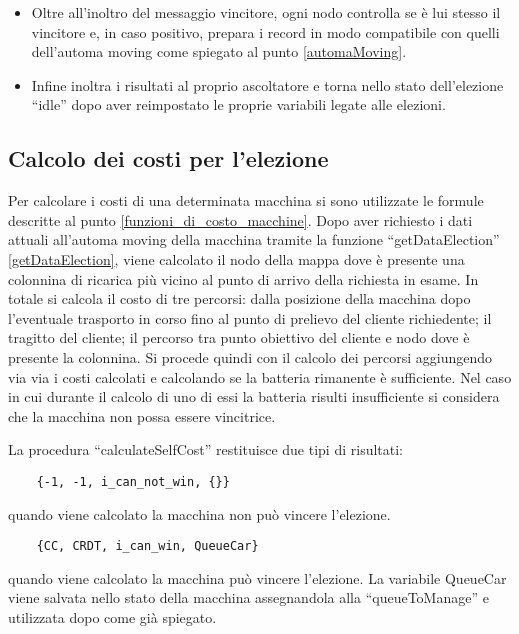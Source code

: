 \begin{itemize}
	\item Oltre all'inoltro del messaggio vincitore, ogni nodo controlla se è lui stesso il vincitore e, in caso positivo, prepara i record in modo compatibile con quelli dell'automa moving come spiegato al punto \ref{automaMoving}.

	\item Infine inoltra i risultati al proprio ascoltatore e torna nello stato dell'elezione ``idle'' dopo aver reimpostato le proprie variabili legate alle elezioni.
\end{itemize}

\subsection{Calcolo dei costi per l'elezione}\label{implementazione_calcolo_costi}
Per calcolare i costi di una determinata macchina si sono utilizzate le formule descritte al punto \ref{funzioni_di_costo_macchine}. Dopo aver richiesto i dati attuali all'automa moving della macchina tramite la funzione ``getDataElection'' \ref{getDataElection}, viene calcolato il nodo della mappa dove è presente una colonnina di ricarica più vicino al punto di arrivo della richiesta in esame.
In totale si calcola il costo di tre percorsi: dalla posizione della macchina dopo l'eventuale trasporto in corso fino al punto di prelievo del cliente richiedente; il tragitto del cliente; il percorso tra punto obiettivo del cliente e nodo dove è presente la colonnina.
Si procede quindi con il calcolo dei percorsi aggiungendo via via i costi calcolati e calcolando se la batteria rimanente è sufficiente. Nel caso in cui durante il calcolo di uno di essi la batteria risulti insufficiente si considera che la macchina non possa essere vincitrice.

La procedura ``calculateSelfCost'' restituisce due tipi di risultati:
\begin{lstlisting}
	{-1, -1, i_can_not_win, {}}
\end{lstlisting}
quando viene calcolato la macchina non può vincere l'elezione.
\begin{lstlisting}
	{CC, CRDT, i_can_win, QueueCar}
\end{lstlisting}
quando viene calcolato la macchina può vincere l'elezione. La variabile QueueCar viene salvata nello stato della macchina assegnandola alla ``queueToManage'' e utilizzata dopo come già spiegato.

